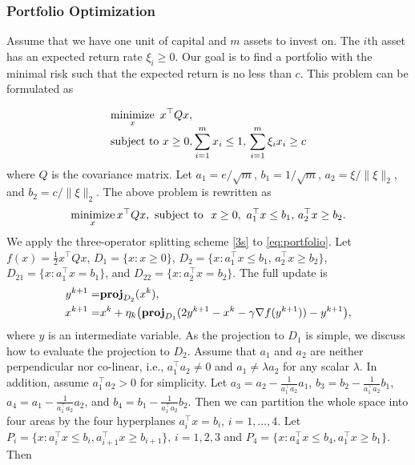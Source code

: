 \subsubsection{Portfolio Optimization}
Assume that we have one unit of capital and $m$ assets to invest on. The $i$th asset has an expected return rate $\xi_i\ge 0$. Our goal is to find a portfolio with the minimal risk such that the expected return is no less than $c$. This problem can be formulated as

\begin{equation*}
\begin{array}{l}
\displaystyle
\Min_x ~x^\top Q x, \\
\displaystyle
\text{subject to}~ x\ge0, \sum_{i=1}^m x_i\le 1,\, \sum_{i=1}^m\xi_i x_i\ge c 
\end{array}
\end{equation*}
where $Q$ is the covariance matrix. Let $a_1=e/\sqrt{m}$, $b_1=1/\sqrt{m}$, $a_2=\xi/\|\xi\|_2$, and $b_2=c/\|\xi\|_2$. The above problem is rewritten as
\begin{equation}\label{eq:portfolio}
\Min_x x^\top Q x,\ \text{subject to }\ x\ge0, ~a_1^\top x\le b_1,\, a_2^\top x\ge b_2.
\end{equation}
We apply the three-operator splitting scheme \eqref{3s} to \eqref{eq:portfolio}. Let $f(x)=\frac{1}{2}x^\top Q x$, $D_1=\{x: x\ge 0\}$, $D_2=\{x: a_1^\top x \le b_1,\, a_2^\top x\ge b_2\}$, $D_{21}=\{x: a_1^\top x=b_1\}$, and $D_{22}=\{x: a_2^\top x=b_2\}$. The full update is
\begin{subequations}\label{eq:3op-portfolio}
\begin{align}
y^{k+1}=&\prj_{D_2}(x^k),\\
x^{k+1}=&x^k+\eta_k\big(\prj_{D_1}(2y^{k+1}-x^k-\gamma \nabla f(y^{k+1}))-y^{k+1}\big), \end{align}
\end{subequations}
where $y$ is an intermediate variable. As the projection to $D_1$ is simple, we discuss how to evaluate the projection to $D_2$. Assume that $a_1$ and $a_2$ are neither perpendicular nor co-linear, i.e., $a_1^\top a_2\neq 0$ and $a_1\neq \lambda a_2$ for any scalar $\lambda$. In addition, assume $a_1^\top a_2>0$ for simplicity. Let $a_3=a_2-\frac{1}{a_1^\top a_2} a_1$, $b_3=b_2-\frac{1}{a_1^\top a_2} b_1$, $a_4=a_1-\frac{1}{a_1^\top a_2} a_2$, and $b_4=b_1-\frac{1}{a_1^\top a_2} b_2$. Then we can partition the whole space into four areas by the four hyperplanes $a_i^\top x=b_i$, $i=1,\ldots,4$. Let $P_i=\{x: a_i^\top x\le b_i, a_{i+1}^\top x\ge b_{i+1}\},\, i=1,2,3$ and $P_4=\{x: a_4^\top x\le b_4, a_1^\top x\ge b_1\}$. Then
